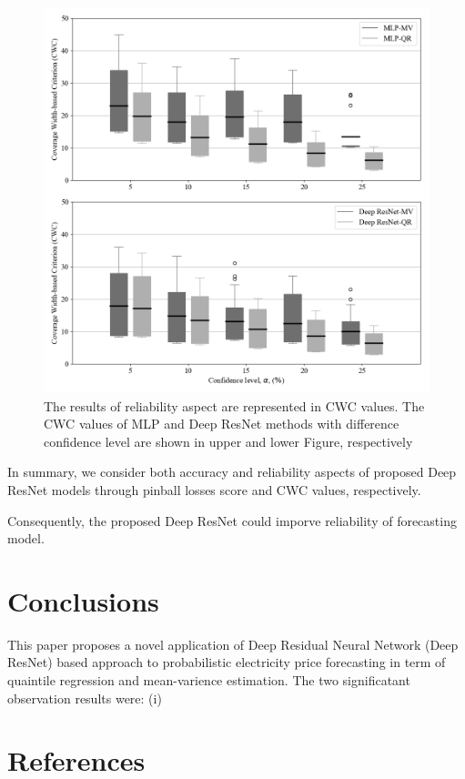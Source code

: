 \documentclass[review]{elsarticle}
\begin{document}
    \begin{figure}[H]
      \centering
      \includegraphics[width=12cm]{boxcompare_MV-QR}
      \caption{The results of reliability aspect are represented in CWC values.
      The CWC values of MLP and Deep ResNet methods with difference confidence level are shown in upper and lower Figure, respectively}
      \label{Fig:CWC}
    \end{figure}

    In summary, we consider both accuracy and reliability aspects of proposed Deep ResNet models through pinball losses score and CWC values, respectively.

    Consequently, the proposed Deep ResNet could imporve reliability of forecasting model.




  \section{Conclusions}
    This paper proposes a novel application of Deep Residual Neural Network (Deep ResNet) based approach to probabilistic electricity price forecasting in term of quaintile regression and mean-varience estimation. The two significatant observation results were: (i)
  \section*{References}
  
\end{document}
